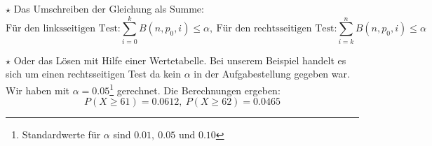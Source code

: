 		\(\star\) Das Umschreiben der Gleichung als Summe:
		\[\text{Für den linksseitigen Test:}\sum_{i=0}^{k}B(n,p_0,i)\leq \alpha,\
		\text{Für den rechtsseitigen Test:}\sum_{i=k}^{n}B(n,p_0,i)\leq \alpha\]
		
		\(\star\) Oder das Lösen mit Hilfe einer Wertetabelle.
		Bei unserem Beispiel handelt es sich um einen rechtsseitigen Test da kein
		\(\alpha\) in der Aufgabestellung gegeben war. Wir haben mit
		\(\alpha=0.05\)\footnote{Standardwerte für \(\alpha\) sind \(0.01,\ 0.05\) und
		\(0.10\)} gerechnet. Die Berechnungen ergeben:
		\[P(X\geq 61)=0.0612,\ P(X\geq 62)=0.0465\] 
